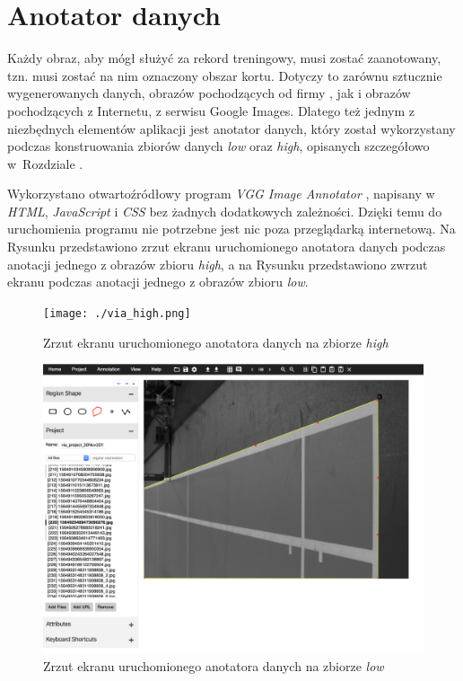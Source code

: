 \newpage
\section{Anotator danych}
\label{sec:anotator}

Każdy obraz, aby mógł służyć za rekord treningowy, musi zostać zaanotowany, tzn. musi zostać na nim oznaczony obszar kortu.
Dotyczy to zarównu sztucznie wygenerowanych danych, obrazów pochodzących od firmy \blue{}, jak i obrazów pochodzących z Internetu, z serwisu Google Images.
Dlatego też jednym z niezbędnych elementów aplikacji jest anotator danych, który został wykorzystany podczas konstruowania zbiorów danych \textit{low} oraz \textit{high}, opisanych szczegółowo w~Rozdziale .

Wykorzystano otwartoźródłowy program \textit{VGG Image Annotator} \cite{dutta2016via} \cite{dutta2019vgg}, napisany w \textit{HTML}, \textit{JavaScript} i \textit{CSS} bez żadnych dodatkowych zależności.
Dzięki temu do uruchomienia programu nie potrzebne jest nic poza przeglądarką internetową.
Na Rysunku  przedstawiono zrzut ekranu uruchomionego anotatora danych podczas anotacji jednego z obrazów zbioru \textit{high}, a na Rysunku  przedstawiono zwrzut ekranu podczas anotacji jednego z obrazów zbioru \textit{low}.

\vspace{1cm}

\begin{figure}[!htb]
  \texttt{[image: ./via\_high.png]}
    \caption{Zrzut ekranu uruchomionego anotatora danych na zbiorze \textit{high}}
    \label{fig:viahigh}
\end{figure}

\begin{figure}[!htb]
  \includegraphics[width=\linewidth]{./via_low.png}
    \caption{Zrzut ekranu uruchomionego anotatora danych na zbiorze \textit{low}}
    \label{fig:vialow}
\end{figure}
